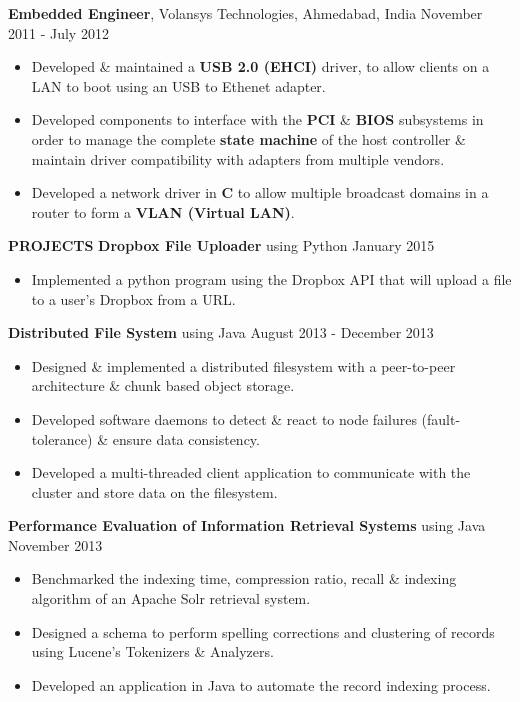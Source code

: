 \documentclass[10pt, letterpaper]{article}
\begin{document}
\textbf{Embedded Engineer}, Volansys Technologies, Ahmedabad, India \hfill November 2011 - July 2012
\begin{itemize}
    \item Developed \& maintained a \textbf{USB 2.0 (EHCI)} driver, to allow 
clients on a LAN to boot using an USB to Ethenet adapter.
    \item Developed components to interface with the \textbf{PCI} \& \textbf{BIOS} 
subsystems in order to manage the complete \textbf{state machine} of the host controller
\& maintain driver compatibility with adapters from multiple vendors. 
    \item Developed a network driver in \textbf{C} to allow multiple broadcast 
domains in a router to form a \textbf{VLAN (Virtual LAN)}.
\end{itemize}

\textbf{PROJECTS}
\smallskip 
\newline
\textbf{Dropbox File Uploader} using Python \hfill January 2015
\begin{itemize}
    \item Implemented a python program using the Dropbox API that will upload a file to a user's Dropbox
from a URL.
\end{itemize}
\textbf{Distributed File System} using Java \hfill August 2013 - December 2013
\begin{itemize}
    \item Designed \& implemented a distributed filesystem with a peer-to-peer 
architecture \& chunk based object storage.
    \item Developed software daemons to detect \& react to node failures (fault-tolerance) \& ensure data consistency.  
    \item Developed a multi-threaded client application to communicate with the cluster and store data on the filesystem.
\end{itemize}

\textbf{Performance Evaluation of Information Retrieval Systems} using Java \hfill November 2013
\begin{itemize}
    \item Benchmarked the indexing time, compression ratio, recall \& indexing 
algorithm of an Apache Solr retrieval system.
    \item Designed a schema to perform spelling corrections and clustering of 
records using Lucene's Tokenizers \& Analyzers.
    \item Developed an application in Java to automate the record indexing process.
\end{itemize}
\end{document}
